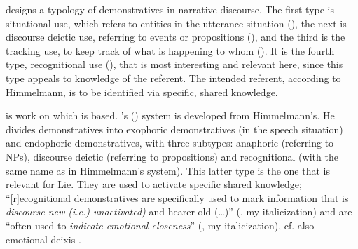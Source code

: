 \documentclass[output=paper,colorlinks,citecolor=brown]{langscibook}
\begin{document}
\citet{Himmelmann1996} designs a typology of demonstratives in narrative discourse. The first type is situational use, which refers to entities in the utterance situation (\citeyear[219]{Himmelmann1996}), the next is discourse deictic use, referring to events or propositions (\citeyear[224]{Himmelmann1996}), and the third is the tracking use, to keep track of what is happening to whom (\citeyear[226]{Himmelmann1996}). It is the fourth type, recognitional use (\citeyear[230]{Himmelmann1996}), that is most interesting and relevant here, since this type appeals to knowledge of the referent. The intended referent, according to Himmelmann, is to be identified via specific, shared knowledge. 

\citet{Diessel1999Book} is work on which \citet{Lie2010} is based. \citeauthor{Diessel1999Book}'s (\citeyear[106]{Diessel1999Book}) system is developed from Himmelmann’s. He divides demonstratives into exophoric demonstratives (in the speech situation) and endophoric demonstratives, with three subtypes: anaphoric (referring to NPs), discourse deictic (referring to propositions) and recognitional (with the same name as in Himmelmann’s system). This latter type is the one that is relevant for Lie. They are used to activate specific shared knowledge; “[r]ecognitional demonstratives are specifically used to mark information that is \textit{discourse new (i.e.) unactivated)} and hearer old (…)” (\citealt[106]{Diessel1999Book}, my italicization) and are “often used to \textit{indicate emotional closeness}” (\citealt[107]{Diessel1999Book}, my italicization), cf. also emotional deixis \citep{Lakoff1974}. 
\end{document}
